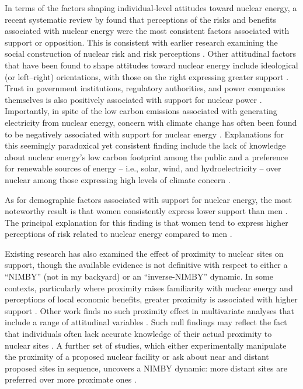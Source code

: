 \documentclass[a4paper, 11pt]{article}
\begin{document}
In terms of the factors shaping individual-level attitudes toward nuclear energy, a recent systematic review by \citet{aina_poy2026} found that perceptions of the risks and benefits associated with nuclear energy were the most consistent factors associated with support or opposition. This is consistent with earlier research examining the social construction of nuclear risk \citep{gamson1989} and risk perceptions \citep{pidgeon2008,greenberg2009,degroot2013,slovic2000,vanderpligt1986}. Other attitudinal factors that have been found to shape attitudes toward nuclear energy include ideological (or left--right) orientations, with those on the right expressing greater support \citep{besley2014,clulow2021,franchino2014,mcbeth2023,sonnberger2021}. Trust in government institutions, regulatory authorities, and power companies themselves is also positively associated with support for nuclear power \citep{konisky2020,mcbeth2023}. Importantly, in spite of the low carbon emissions associated with generating electricity from nuclear energy, concern with climate change has often been found to be negatively associated with support for nuclear energy \citep{clulow2021,corner2011,konisky2020,sonnberger2021}. Explanations for this seemingly paradoxical yet consistent finding include the lack of knowledge about nuclear energy's low carbon footprint among the public \citep{bickerstaff2008} and a preference for renewable sources of energy -- i.e., solar, wind, and hydroelectricity -- over nuclear among those expressing high levels of climate concern \citep{pidgeon2008}.

As for demographic factors associated with support for nuclear energy, the most noteworthy result is that women consistently express lower support than men \citep{aina_baici_poy2026,cale2015,clulow2021,corner2011,greenberg2009,kiviluoma2025,konisky2020,sonnberger2021,venables2012}. The principal explanation for this finding is that women tend to express higher perceptions of risk related to nuclear energy compared to men \citep{degroot2013,slovic2000}.

Existing research has also examined the effect of proximity to nuclear sites on support, though the available evidence is not definitive with respect to either a ``NIMBY'' (not in my backyard) or an ``inverse-NIMBY'' dynamic. In some contexts, particularly where proximity raises familiarity with nuclear energy and perceptions of local economic benefits, greater proximity is associated with higher support \citep{greenberg2009,mcbeth2023,vanderpligt1986}. Other work finds no such proximity effect in multivariate analyses that include a range of attitudinal variables \citep{aina_baici_poy2026,cale2015,konisky2020}. Such null findings may reflect the fact that individuals often lack accurate knowledge of their actual proximity to nuclear sites \citep{lyons2020}. A further set of studies, which either experimentally manipulate the proximity of a proposed nuclear facility or ask about near and distant proposed sites in sequence, uncovers a NIMBY dynamic: more distant sites are preferred over more proximate ones \citep{biten2026,durdovic2025,hlavacek2023,jones2026,kiviluoma2025,seo2026}.
\end{document}

